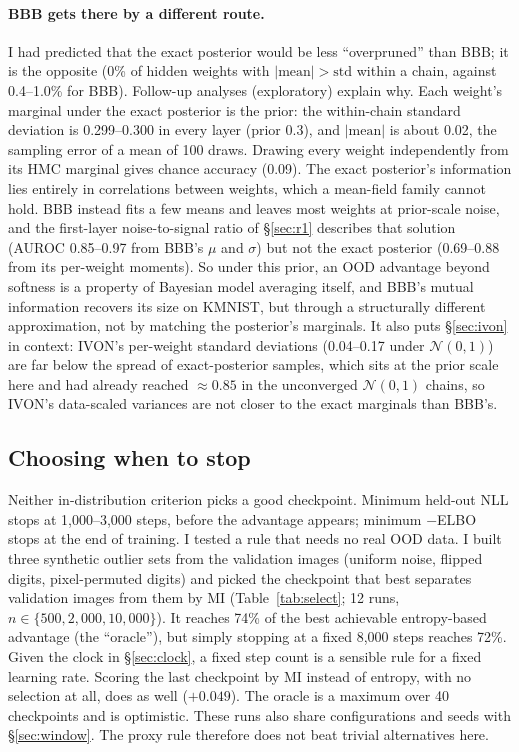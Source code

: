 \documentclass[11pt]{article}
\begin{document}
\paragraph{BBB gets there by a different route.} I had predicted that the
exact posterior would be less ``overpruned'' than BBB; it is the opposite
(0\% of hidden weights with $|\text{mean}|>\text{std}$ within a chain, against
0.4--1.0\% for BBB). Follow-up analyses (exploratory) explain why. Each
weight's marginal under the exact posterior is the prior: the within-chain
standard deviation is 0.299--0.300 in every layer (prior 0.3), and $|\text{mean}|$
is about 0.02, the sampling error of a mean of 100 draws. Drawing every weight
independently from its HMC marginal gives chance accuracy (0.09). The exact
posterior's information lies entirely in correlations between weights, which a
mean-field family cannot hold. BBB instead fits a few means and leaves most
weights at prior-scale noise, and the first-layer noise-to-signal ratio of
\S\ref{sec:r1} describes that solution (AUROC 0.85--0.97 from BBB's $\mu$
and $\sigma$) but not the exact posterior (0.69--0.88 from its per-weight
moments). So under this prior, an OOD advantage beyond softness is a property
of Bayesian model averaging itself, and BBB's mutual information recovers its
size on KMNIST, but through a structurally different approximation, not by
matching the posterior's marginals. It also puts \S\ref{sec:ivon} in context:
IVON's per-weight standard deviations (0.04--0.17 under $\mathcal N(0,1)$) are far
below the spread of exact-posterior samples, which sits at the prior scale
here and had already reached $\approx0.85$ in the unconverged $\mathcal N(0,1)$
chains, so IVON's data-scaled variances are not closer to the exact
marginals than BBB's.

\subsection{Choosing when to stop}\label{sec:select}
Neither in-distribution criterion picks a good checkpoint. Minimum held-out
NLL stops at 1{,}000--3{,}000 steps, before the advantage appears; minimum
$-$ELBO stops at the end of training. I tested a rule that needs no real OOD
data. I built three synthetic outlier sets from the validation images
(uniform noise, flipped digits, pixel-permuted digits) and picked the
checkpoint that best separates validation images from them by MI
(Table~\ref{tab:select}; 12 runs, $n\in\{500, 2{,}000, 10{,}000\}$). It reaches
74\% of the best achievable entropy-based advantage (the ``oracle''), but
simply stopping at a fixed 8{,}000 steps reaches 72\%. Given the clock in
\S\ref{sec:clock}, a fixed step count is a sensible rule for a fixed learning
rate. Scoring the last
checkpoint by MI instead of entropy, with no selection at all, does as well
($+0.049$). The oracle is a maximum over 40 checkpoints and is optimistic. These
runs also share configurations and seeds with \S\ref{sec:window}. The proxy
rule therefore does not beat trivial alternatives here.
\end{document}
